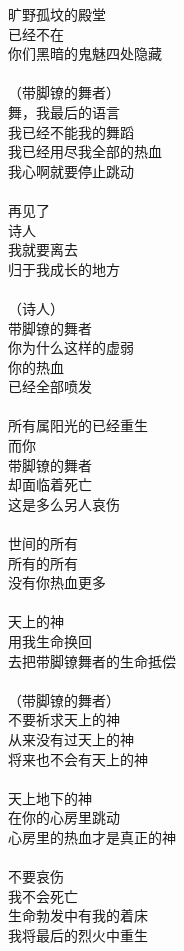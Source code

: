 旷野孤坟的殿堂\\
已经不在\\
你们黑暗的鬼魅四处隐藏\\
\\
（带脚镣的舞者）\\
舞，我最后的语言\\
我已经不能我的舞蹈\\
我已经用尽我全部的热血\\
我心啊就要停止跳动\\
\\
再见了\\
诗人\\
我就要离去\\
归于我成长的地方\\
\\
（诗人）\\
带脚镣的舞者\\
你为什么这样的虚弱\\
你的热血\\
已经全部喷发\\
\\
所有属阳光的已经重生\\
而你\\
带脚镣的舞者\\
却面临着死亡\\
这是多么另人哀伤\\
\\
世间的所有\\
所有的所有\\
没有你热血更多\\
\\
天上的神\\
用我生命换回\\
去把带脚镣舞者的生命抵偿\\
\\
（带脚镣的舞者）\\
不要祈求天上的神\\
从来没有过天上的神\\
将来也不会有天上的神\\
\\
天上地下的神\\
在你的心房里跳动\\
心房里的热血才是真正的神\\
\\
不要哀伤\\
我不会死亡\\
生命勃发中有我的着床\\
我将最后的烈火中重生\\
